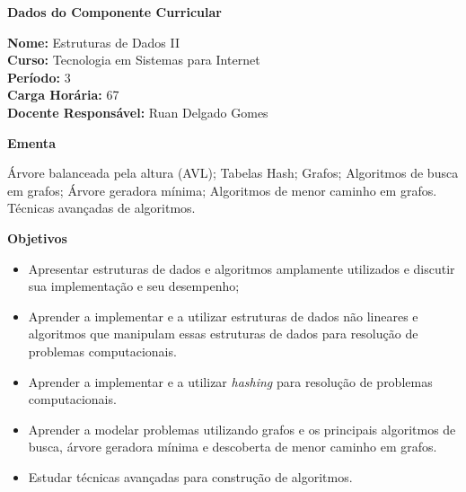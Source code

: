 

\begin{snugshade}\begin{center}\textbf{
    Dados do Componente Curricular
}\end{center}\end{snugshade}

\noindent \textbf{Nome:}                Estruturas de Dados II
\\        \textbf{Curso:}               Tecnologia em Sistemas para Internet
\\        \textbf{Período:}             \unit{3}{\degree}
\\        \textbf{Carga Horária:}       \unit{67}{\hour}
\\        \textbf{Docente Responsável:} Ruan Delgado Gomes


\begin{snugshade}\begin{center}\textbf{
    Ementa
\vphantom{q}}\end{center}\end{snugshade}

\noindent
\'Arvore balanceada pela altura (AVL); Tabelas Hash; Grafos; Algoritmos de busca em grafos; \'Arvore geradora m\'inima; Algoritmos de menor caminho em grafos. Técnicas avançadas de algoritmos.


\begin{snugshade}\begin{center}\textbf{
    Objetivos
}\end{center}\end{snugshade}

\begin{itemize}

\item Apresentar estruturas de dados e algoritmos amplamente utilizados e discutir sua implementação e seu desempenho;

\item Aprender a implementar e a utilizar estruturas de dados n\~ao lineares e algoritmos que manipulam essas estruturas de dados para resolu\c{c}\~ao de problemas computacionais.

\item Aprender a implementar e a utilizar \emph{hashing} para resolu\c{c}\~ao de problemas computacionais.

\item Aprender a modelar problemas utilizando grafos e os principais algoritmos de busca, árvore geradora mínima e descoberta de menor caminho em grafos.

\item Estudar técnicas avançadas para construção de algoritmos.

\end{itemize} 

